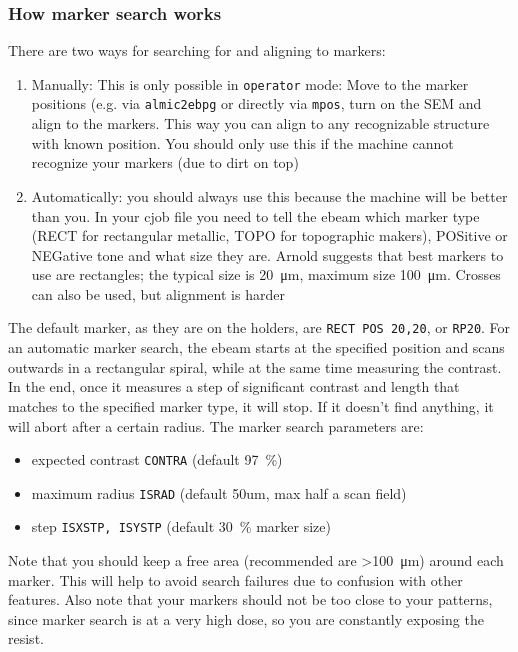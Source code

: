 \subsubsection{How marker search works}
There are two ways for searching for and aligning to markers:
\begin{enumerate}
	\item Manually: This is only possible in \lstinline|operator| mode: Move to the marker positions (e.g. via \lstinline|almic2ebpg| or directly via \lstinline|mpos|, turn on the SEM and align to the markers. This way you can align to any recognizable structure with known position. You should only use this if the machine cannot recognize your markers (due to dirt on top)
	\item Automatically: you should always use this because the machine will be better than you. In your cjob file you need to tell the ebeam which marker type (RECT for rectangular metallic, TOPO for topographic makers), POSitive or NEGative tone and what size they are. Arnold suggests that best markers to use are rectangles; the typical size is \SI{20}{\micro\meter}, maximum size \SI{100}{\micro\meter}. Crosses can also be used, but alignment is harder
\end{enumerate}

The default marker, as they are on the holders, are \lstinline|RECT POS 20,20|, or \lstinline|RP20|.
For an automatic marker search, the ebeam starts at the specified position and scans outwards in a rectangular spiral, while at the same time measuring the contrast. In the end, once it measures a step of significant contrast and length that matches to the specified marker type, it will stop. If it doesn't find anything, it will abort after a certain radius.
The marker search parameters are:
\begin{itemize}
	\item expected contrast \lstinline|CONTRA| (default \SI{97}{\percent})
	\item maximum radius \lstinline|ISRAD| (default 50um, max half a scan field)
	\item step \lstinline|ISXSTP, ISYSTP| (default \SI{30}{\percent} marker size)
\end{itemize}
 
Note that you should keep a free area (recommended are >\SI{100}{\micro\meter}) around each marker. This will help to avoid search failures due to confusion with other features. Also note that your markers should not be too close to your patterns, since marker search is at a very high dose, so you are constantly exposing the resist.

